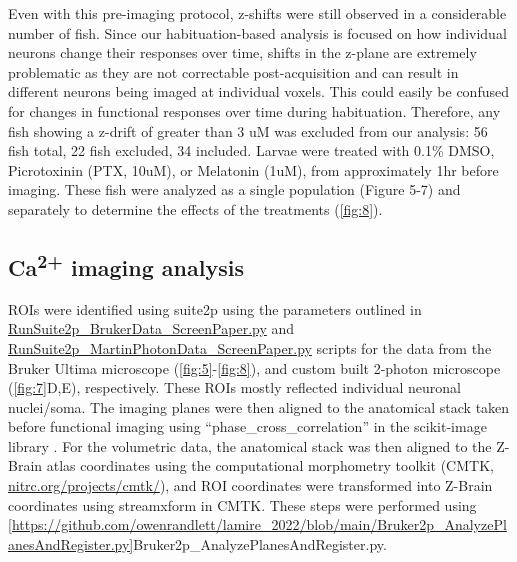 \documentclass[9pt,lineno]{RandlettLab_elife}
\begin{document}
Even with this pre-imaging protocol, z-shifts were still observed in a considerable number of fish. Since our habituation-based analysis is focused on how individual neurons change their responses over time, shifts in the z-plane are extremely problematic as they are not correctable post-acquisition and can result in different neurons being imaged at individual voxels. This could easily be confused for changes in functional responses over time during habituation. Therefore, any fish showing a z-drift of greater than 3 uM was excluded from our analysis: 56 fish total, 22 fish excluded, 34 included. Larvae were treated with 0.1\% DMSO, Picrotoxinin (PTX, 10uM), or Melatonin (1uM), from approximately 1hr before imaging. These fish were analyzed as a single population (Figure 5-7) and separately to determine the effects of the treatments (\autoref{fig:8}). 

\subsection{Ca\textsuperscript{2+} imaging analysis}

ROIs were identified using suite2p \cite{Pachitariu2017-ad} using the parameters outlined in 
\\ \href{https://github.com/owenrandlett/lamire_2022/blob/main/RunSuite2p_BrukerData_ScreenPaper.py}{RunSuite2p\_BrukerData\_ScreenPaper.py} and  \href{https://github.com/owenrandlett/lamire_2022/blob/main/RunSuite2p_MartinPhotonData_ScreenPaper.py}{RunSuite2p\_MartinPhotonData\_ScreenPaper.py} scripts for the data from the Bruker Ultima microscope (\autoref{fig:5}-\autoref{fig:8}), and custom built 2-photon microscope (\autoref{fig:7}D,E), respectively. These ROIs mostly reflected individual neuronal nuclei/soma. The imaging planes were then aligned to the anatomical stack taken before functional imaging using “phase\_cross\_correlation” in the scikit-image library \cite{Van_der_Walt2014-hx}. For the volumetric data, the anatomical stack was then aligned to the Z-Brain atlas coordinates using the computational morphometry toolkit (CMTK, \href{//www.nitrc.org/projects/cmtk/}{nitrc.org/projects/cmtk/}), and ROI coordinates were transformed into Z-Brain coordinates using streamxform in CMTK. These steps were performed using 
\\ \ref{https://github.com/owenrandlett/lamire_2022/blob/main/Bruker2p_AnalyzePlanesAndRegister.py}{Bruker2p\_AnalyzePlanesAndRegister.py}. 
\end{document}
